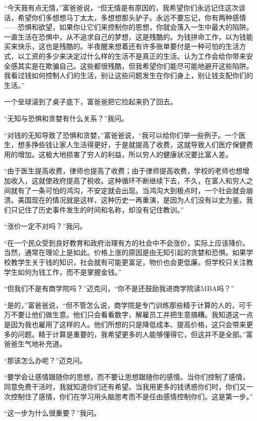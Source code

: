 “今天我有点无情，”富爸爸说，“但无情是有原因的，我希望你们永远记住这次谈话，希望你们多想想马丁太太，多想想那头驴子。永远不要忘记，你有两种感情——恐惧和欲望，如果你让它们来控制你的思想，你就会落入一生中最大的陷阱。一直生活在恐惧中，从不追求自己的梦想，这是残酷的。为钱拼命工作，以为钱能买来快乐，这也是残酷的。半夜醒来想着还有许多账单要付是一种可怕的生活方式，以工资的多少来决定过什么样的生活不是真正的生活。认为工作会给你带来安全感其实是在欺骗自己。这些都很残酷，但我希望你们能尽可能地避开这些陷阱。我看过钱如何控制人们的生活，别让这些问题发生在你们身上，别让钱支配你们的生活。”

一个垒球滚到了桌子底下，富爸爸把它捡起来扔了回去。

“无知与恐惧和贪婪有什么关系？”我问。

“对钱的无知导致了恐惧和贪婪，”富爸爸说，“我可以给你们举一些例子。一个医生，想多挣些钱让家人生活得更好，于是就提高了收费，这就导致人们医疗保健费用的增加。这极大地损害了穷人的利益，所以穷人的健康状况要比富人差。

“由于医生提高收费，律师也提高了收费；由于律师提高收费，学校的老师也想增加收入，这就使政府提高了税收。这种循环不断继续下去，不久，在富人和穷人之间就有了一条可怕的鸿沟，不安定就会出现。当鸿沟大到极点时，一个社会就会崩溃。美国现在的情况就是这样，这种历史一再重演，是因为人们没有以史为鉴。我们只记住了历史事件发生的时间和名称，却没有记住教训。”

“涨价一定不对吗？”我问。

“在一个民众受到良好教育和政府治理有方的社会中不会涨价，实际上应该降价。当然，通常在理论上是如此。价格上涨的原因是由无知引起的贪婪和恐惧。如果学校教学生关于钱的知识，社会就有可能更富足，物价也会更低廉。但学校只关注教学生如何为钱工作，而不是掌握金钱。”

“但我们不是有商学院吗？”迈克问，“你不是还鼓励我进商学院读MBA吗？”

“是的，”富爸爸说，“但不管怎么说，商学院是专门训练那些精于计算的人的，可千万不要让他们做生意。他们只会看看数字，解雇员工并把生意搞糟。我知道这一点是因为我也雇用了这样的人。他们所想的只是降低成本、提高价格，这只会带来更多的问题。精于计算是重要的，我希望更多的人能够懂得它，但这并不是全部。”富爸爸生气地补充道。

“那该怎么办呢？”迈克问。

“要学会让感情跟随你的思想，而不要让思想跟随你的感情。当你们控制了感情，同意免费干活时，我就知道你们还有希望。当我用更多的钱诱惑你们时，你们又一次控制住了感情，你们在学习用头脑思考而不是任由感情控制你们。这是第一步。”

“这一步为什么很重要？”我问。

